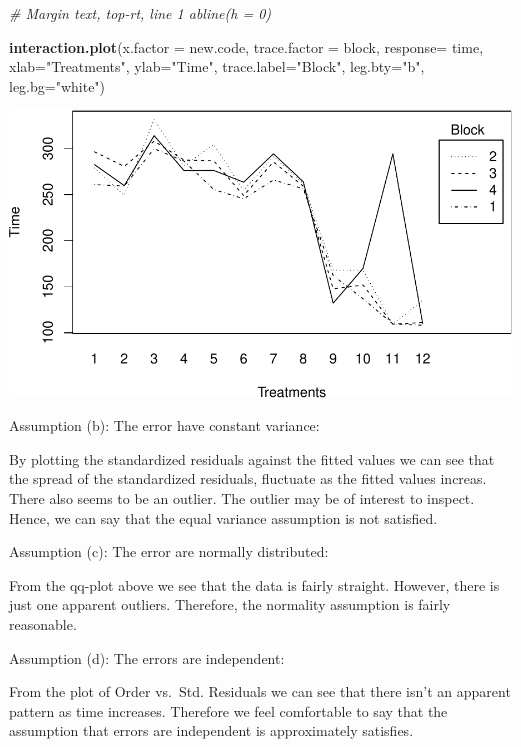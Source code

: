 \documentclass[12pt,]{article}
\newenvironment{Shaded}{\begin{snugshade}}{\end{snugshade}}
\newcommand{\KeywordTok}[1]{\textcolor[rgb]{0.13,0.29,0.53}{\textbf{#1}}}
\newcommand{\DataTypeTok}[1]{\textcolor[rgb]{0.13,0.29,0.53}{#1}}
\newcommand{\StringTok}[1]{\textcolor[rgb]{0.31,0.60,0.02}{#1}}
\newcommand{\CommentTok}[1]{\textcolor[rgb]{0.56,0.35,0.01}{\textit{#1}}}
\newcommand{\NormalTok}[1]{#1}
\begin{document}
\begin{Shaded}
\begin{Highlighting}[]
 \CommentTok{# Margin text, top-rt, line 1 abline(h = 0)}

\KeywordTok{interaction.plot}\NormalTok{(}\DataTypeTok{x.factor =}\NormalTok{ new.code, }\DataTypeTok{trace.factor =}\NormalTok{ block, }
                 \DataTypeTok{response=}\NormalTok{ time, }\DataTypeTok{xlab=}\StringTok{"Treatments"}\NormalTok{, }\DataTypeTok{ylab=}\StringTok{"Time"}\NormalTok{, }
                 \DataTypeTok{trace.label=}\StringTok{"Block"}\NormalTok{, }\DataTypeTok{leg.bty=}\StringTok{"b"}\NormalTok{, }\DataTypeTok{leg.bg=}\StringTok{"white"}\NormalTok{)}
\end{Highlighting}
\end{Shaded}

\includegraphics{Markdown_HW_8_files/figure-latex/unnamed-chunk-4-2.pdf}

Assumption (b): The error have constant variance:

By plotting the standardized residuals against the fitted values we can
see that the spread of the standardized residuals, fluctuate as the
fitted values increas. There also seems to be an outlier. The outlier
may be of interest to inspect. Hence, we can say that the equal variance
assumption is not satisfied.

Assumption (c): The error are normally distributed:

From the qq-plot above we see that the data is fairly straight. However,
there is just one apparent outliers. Therefore, the normality assumption
is fairly reasonable.

Assumption (d): The errors are independent:

From the plot of Order vs.~Std. Residuals we can see that there isn't an
apparent pattern as time increases. Therefore we feel comfortable to say
that the assumption that errors are independent is approximately
satisfies.
\end{document}
